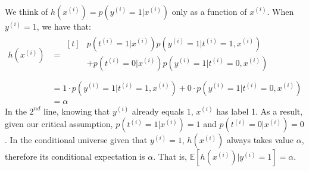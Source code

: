 \begin{answer}
	We think of $h(x^{(i)}) = p(y^{(i)} = 1|x^{(i)})$ only as a function of $x^{(i)}$. When $y^{(i)} = 1$, we have that:
\begin{align}
	h(x^{(i)}) &=
	\begin{aligned}[t]  
	& p(t^{(i)} = 1|x^{(i)}) p(y^{(i)} = 1|t^{(i)} = 1, x^{(i)}) \\
	& + p(t^{(i)} = 0|x^{(i)}) p(y^{(i)} = 1|t^{(i)} = 0, x^{(i)}) \\
	\end{aligned} \\
	&= 1 \cdot p(y^{(i)} = 1|t^{(i)} = 1, x^{(i)}) + 0 \cdot p(y^{(i)} = 1|t^{(i)} = 0, x^{(i)}) \\
	&= \alpha
\end{align}
%
In the $2^{nd}$ line, knowing that $y^{(i)}$ already equals 1, $x^{(i)}$ has label 1. As a result, given our critical assumption, $p(t^{(i)} = 1|x^{(i)}) = 1$ and $p(t^{(i)} = 0|x^{(i)}) = 0$. In the conditional universe given that $y^{(i)} = 1$, $h(x^{(i)})$ always takes value $\alpha$, therefore its conditional expectation is $\alpha$. That is, $\mathbb{E}[h(x^{(i)}) | y^{(i)} = 1] = \alpha$. \\
\end{answer}